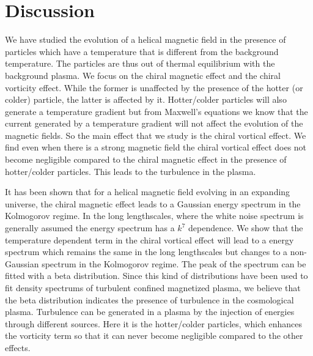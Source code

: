 \documentclass{ws-mpla}
\begin{document}
\section{Discussion}
\label{sec:discussion}
We have studied the evolution of a helical magnetic field in the presence of particles which have a temperature that is different from the background temperature. 
The particles are thus out of thermal equilibrium with the background 
plasma. We focus on the chiral magnetic effect and the chiral vorticity effect. While the former is unaffected by the presence of the hotter (or colder) particle, the latter 
is affected by it. Hotter/colder particles will also generate a temperature gradient but from Maxwell's equations we know that the current generated by a temperature 
gradient will not affect the evolution of the magnetic fields. So the main effect that we study is the chiral vortical effect. We find even when there is a strong 
magnetic field the chiral vortical effect does not become negligible compared to the chiral magnetic effect in the presence of hotter/colder particles. This leads to the 
turbulence in the plasma. 

It has been shown that for a helical magnetic field evolving in an expanding universe, the chiral magnetic effect leads to a Gaussian energy spectrum in the Kolmogorov 
regime. In the long lengthscales, where the white noise spectrum is generally assumed the energy spectrum has a $k^7$ dependence. We show that the temperature dependent 
term in the chiral vortical effect will lead to a energy spectrum which remains the same in the long lengthscales but changes to a non-Gaussian spectrum in the 
Kolmogorov regime. The peak of the spectrum can be fitted with a beta distribution. Since this kind of distributions have been used to fit density spectrums of 
turbulent confined magnetized plasma, we believe that the beta distribution indicates the presence of turbulence in the cosmological plasma. Turbulence can be 
generated in a plasma by the injection of energies through different sources. Here it is the hotter/colder particles, which enhances the vorticity term so that it 
can never become negligible compared to the other effects. 
\end{document}
